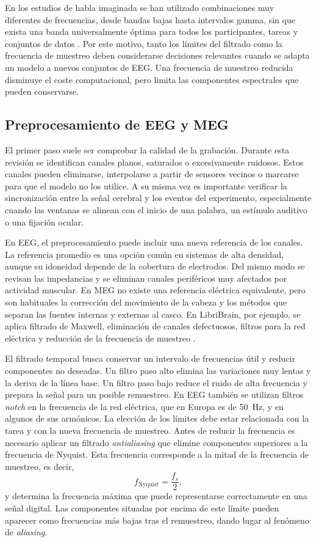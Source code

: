 En los estudios de habla imaginada se han utilizado combinaciones muy diferentes de frecuencias, desde bandas bajas hasta intervalos gamma, sin que exista una banda universalmente óptima para todos los participantes, tareas y conjuntos de datos \cite{panachakel2021covert,alzahrani2024systematic}. Por este motivo, tanto los límites del filtrado como la frecuencia de muestreo deben considerarse decisiones relevantes cuando se adapta un modelo a nuevos conjuntos de EEG. Una frecuencia de muestreo reducida disminuye el coste computacional, pero limita las componentes espectrales que pueden conservarse.

\subsection{Preprocesamiento de EEG y MEG}

El primer paso suele ser comprobar la calidad de la grabación. Durante esta revisión se identifican canales planos, saturados o excesivamente ruidosos. Estos canales pueden eliminarse, interpolarse a partir de sensores vecinos o marcarse para que el modelo no los utilice. A su misma vez es importante verificar la sincronización entre la señal cerebral y los eventos del experimento, especialmente cuando las ventanas se alinean con el inicio de una palabra, un estímulo auditivo o una fijación ocular.

En EEG, el preprocesamiento puede incluir una nueva referencia de los canales. La referencia promedio es una opción común en sistemas de alta densidad, aunque su idoneidad depende de la cobertura de electrodos. Del mismo modo se revisan las impedancias y se eliminan canales periféricos muy afectados por actividad muscular. En MEG no existe una referencia eléctrica equivalente, pero son habituales la corrección del movimiento de la cabeza y los métodos que separan las fuentes internas y externas al casco. En LibriBrain, por ejemplo, se aplica filtrado de Maxwell, eliminación de canales defectuosos, filtros para la red eléctrica y reducción de la frecuencia de muestreo \cite{ozdogan2025libribrain}.

El filtrado temporal busca conservar un intervalo de frecuencias útil y reducir componentes no deseadas. Un filtro paso alto elimina las variaciones muy lentas y la deriva de la línea base. Un filtro paso bajo reduce el ruido de alta frecuencia y prepara la señal para un posible remuestreo. En EEG también se utilizan filtros \textit{notch} en la frecuencia de la red eléctrica, que en Europa es de 50~Hz, y en algunos de sus armónicos. La elección de los límites debe estar relacionada con la tarea y con la nueva frecuencia de muestreo. Antes de reducir la frecuencia es necesario aplicar un filtrado \textit{antialiasing} que elimine componentes superiores a la frecuencia de Nyquist. Esta frecuencia corresponde a la mitad de la frecuencia de muestreo, es decir,
\[
f_{\mathrm{Nyquist}} = \frac{f_s}{2},
\]
y determina la frecuencia máxima que puede representarse correctamente en una señal digital. Las componentes situadas por encima de este límite pueden aparecer como frecuencias más bajas tras el remuestreo, dando lugar al fenómeno de \textit{aliasing}.

